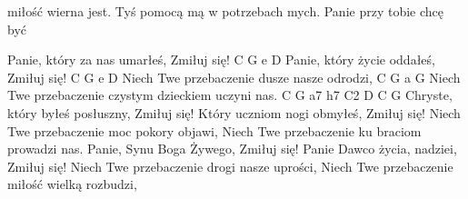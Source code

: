 miłość wierna jest.
	Tyś pomocą mą w potrzebach mych.
	Panie przy tobie chcę być
\endchorus
\endsong

\beginverse
	Panie, który za nas umarłeś, Zmiłuj się!  C G e D
	Panie, który życie oddałeś, Zmiłuj się!  C G e D
\endverse
\beginchorus
	Niech Twe przebaczenie dusze nasze odrodzi,  C G a G
	Niech Twe przebaczenie czystym dzieckiem uczyni nas.  C G a7 h7 C2 D C G
\endchorus
\chordsoff
\beginverse
	Chryste, który byłeś posłuszny, Zmiłuj się!
	Który uczniom nogi obmyłeś, Zmiłuj się!
\endverse
\beginchorus
	Niech Twe przebaczenie moc pokory objawi,
	Niech Twe przebaczenie ku braciom prowadzi nas.
\endchorus
\beginverse
	Panie, Synu Boga Żywego, Zmiłuj się!
	Panie Dawco życia, nadziei, Zmiłuj się!
\endverse
\beginchorus
	Niech Twe przebaczenie drogi nasze uprości,
	Niech Twe przebaczenie miłość wielką rozbudzi,
\endchorus
\endsong\]\]\]\]\]\]\]\]\]\]\]\]\]\]\]\]\]\]\]\]\]\]\]\]\]\]\]\]\]\]\]\]\]\]\]\]\]\]\]\]\]\]\]\]\]\]\]\]\]\]\]\]\]\]\]\]\]\]\]\]\]\]\]\]\]\]\]\]\]\]\]\]\]\]\]\]\]\]\]\]\]\]\]\]\]\]\]\]\]\]\]\]\]\]\]\]\]\]\]\]\]\]\]\]\]\]\]\]\]\]\]\]\]\]\]\]\]\]\]\]\]\]\]\]\]\]\]\]\]\]\]\]\]\]\]\]\]\]\]\]\]\]\]\]\]\]\]\]\]\]\]\]\]\]\]\]\]\]\]\]\]\]\]\]\]\]\]\]\]\]\]\]\]\]\]\]\]\]\]\]\]\]\]\]\]\]\]\]\]\]\]\]\]\]\]\]\]\]\]\]\]\]\]\]\]\]\]\]\]\]\]\]\]\]\]\]\]\]\]\]\]\]\]\]\]\]\]\]\]\]\]\]\]\]\]\]\]\]\]\]\]\]\]\]\]\]\]\]\]\]\]\]\]\]\]\]\]\]\]\]\]\]\]\]\]\]\]\]\]\]\]\]\]\]\]\]\]\]\]\]\]\]\]\]\]\]\]\]\]\]\]\]\]\]\]\]\]\]\]\]\]\]\]\]\]\]\]\]\]\]\]\]\]\]\]\]\]\]\]\]\]\]\]\]\]\]\]\]\]\]\]\]\]\]\]\]\]\]\]\]\]\]\]\]\]\]\]\]\]\]\]\]\]\]\]\]\]\]\]\]\]\]\]\]\]\]\]\]\]\]\]\]\]\]\]\]\]\]\]\]\]\]\]\]\]\]\]\]\]\]\]\]\]\]\]\]\]\]\]\]\]\]\]\]\]\]\]\]\]\]\]\]\]\]\]\]\]\]\]\]\]\]\]\]\]\]\]\]\]\]\]\]\]\]\]\]\]\]\]\]\]\]\]\]\]\]\]\]\]\]\]\]\]\]\]\]\]\]\]\]\]\]\]\]\]\]\]\]\]\]\]\]\]\]\]\]\]\]\]\]\]\]\]\]\]\]\]\]\]\]\]\]\]\]\]\]\]\]\]\]\]\]\]\]\]\]\]\]\]\]\]\]\]\]\]\]\]\]\]\]\]\]\]\]\]\]\]\]\]\]\]\]\]\]\]\]\]\]\]\]\]\]\]\]\]\]\]\]\]\]\]\]\]\]\]\]\]\]\]\]\]\]\]\]\]\]\]\]\]\]\]\]\]\]\]\]\]\]\]\]\]\]\]\]\]\]\]\]\]\]\]\]\]\]\]\]\]\]\]\]\]\]\]\]\]\]\]\]\]\]\]\]\]\]\]\]\]\]\]\]\]\]\]\]\]\]\]\]\]\]\]\]\]\]\]\]\]\]\]\]\]\]\]\]\]\]\]\]\]\]\]\]\]\]\]\]\]\]\]\]\]\]\]\]\]\]\]\]\]\]\]\]\]\]\]\]\]\]\]\]\]\]\]\]\]\]\]\]\]\]\]\]\]\]\]\]\]\]\]\]\]\]\]\]\]\]\]\]\]\]\]\]\]\]\]\]\]\]\]\]\]\]\]\]\]\]\]\]\]\]\]\]\]\]\]\]\]\]\]\]\]\]\]\]\]\]\]\]\]\]\]\]\]\]\]\]\]\]\]\]\]\]\]\]\]\]\]\]\]\]\]\]\]\]\]\]\]\]\]\]\]\]\]\]\]\]\]\]\]\]\]\]\]\]\]\]\]\]\]\]\]\]\]\]\]\]\]\]\]\]\]\]\]\]\]\]\]\]\]\]\]\]\]\]\]\]\]\]\]\]\]\]\]\]\]\]\]\]\]\]\]\]\]\]\]\]\]\]\]\]\]\]\]\]\]\]\]\]\]\]\]\]\]\]\]\]\]\]\]\]\]\]\]\]\]\]\]\]\]\]\]\]\]\]\]\]\]\]\]\]\]\]\]\]\]\]\]\]\]\]\]\]\]\]\]\]\]\]\]\]\]\]\]\]\]\]\]\]\]\]\]\]\]\]\]\]\]\]\]\]\]\]\]\]\]\]\]\]\]\]\]\]\]\]\]\]\]\]\]\]\]\]\]\]\]\]\]\]\]\]\]\]\]\]\]\]\]\]\]\]\]\]\]\]\]\]\]\]\]\]\]\]\]\]\]\]\]\]\]\]\]\]\]\]\]\]\]\]\]\]\]\]\]\]\]\]\]\]\]\]\]\]\]\]\]\]\]\]\]\]\]\]\]\]\]\]\]\]\]\]\]\]\]\]\]\]\]\]\]\]\]\]\]\]\]\]\]\]\]\]\]\]\]\]\]\]\]\]\]\]\]\]\]\]\]\]\]\]\]\]\]\]\]\]\]\]\]\]\]\]\]\]\]\]\]\]\]\]\]\]\]\]\]\]\]\]\]\]\]\]\]\]\]\]\]\]\]\]\]\]\]\]\]\]\]\]\]\]\]\]\]\]\]\]\]\]\]\]\]\]\]\]\]\]\]\]\]\]\]\]\]\]\]\]\]\]\]\]\]\]\]\]\]\]\]\]\]\]\]\]\]\]\]\]\]\]\]\]\]\]\]\]\]\]\]\]\]\]\]\]\]\]\]\]\]\]\]\]\]\]\]\]\]\]\]\]\]\]\]\]\]\]\]\]\]\]\]\]\]\]\]\]\]\]\]\]\]\]\]\]\]\]\]\]\]\]\]\]\]\]\]\]\]\]\]\]\]\]\]\]\]\]\]\]\]\]\]\]\]\]\]\]\]\]\]\]\]\]\]\]\]\]\]\]\]\]\]\]\]\]\]\]\]\]\]\]\]\]\]\]\]\]\]\]\]\]\]\]\]\]\]\]\]\]\]\]\]\]\]\]\]\]\]\]\]\]\]\]\]\]\]\]\]\]\]\]\]\]\]\]\]\]\]\]\]\]\]\]\]\]\]\]\]\]\]\]\]\]\]\]\]\]\]\]\]\]\]\]\]\]\]\]\]\]\]\]\]\]\]\]\]\]\]\]\]\]\]\]\]\]\]\]\]\]\]\]\]\]\]\]\]\]\]\]\]\]\]\]\]\]\]\]\]\]\]\]\]\]\]\]\]\]\]\]\]\]\]\]\]\]\]\]\]\]\]\]\]\]\]\]\]\]\]\]\]\]\]\]\]\]\]\]\]\]\]\]\]\]\]\]\]\]\]\]\]\]\]\]\]\]\]\]\]\]\]\]\]\]\]\]\]\]\]\]\]\]\]\]\]\]\]\]\]\]\]\]\]\]\]\]\]\]\]\]\]\]\]\]\]\]\]\]\]\]\]\]\]\]\]\]\]\]\]\]\]\]\]\]\]\]\]\]\]\]\]\]\]\]\]\]\]\]\]\]\]\]\]\]\]\]\]\]\]\]\]\]\]\]\]\]\]\]\]\]\]\]\]\]\]\]\]\]\]\]\]\]\]\]\]\]\]\]\]\]\]\]\]\]\]\]\]\]\]\]\]\]\]\]\]\]\]\]\]\]\]\]\]\]\]\]\]\]\]\]\]\]\]\]\]\]\]\]\]\]\]\]\]\]\]\]\]\]\]\]\]\]\]\]\]\]\]\]\]\]\]\]\]\]\]\]\]\]\]\]\]\]\]\]\]\]\]\]\]\]\]\]\]\]\]\]\]\]\]\]\]\]\]\]\]\]\]\]\]\]\]\]\]\]\]\]\]\]\]\]\]\]\]\]\]\]\]\]\]\]\]\]
